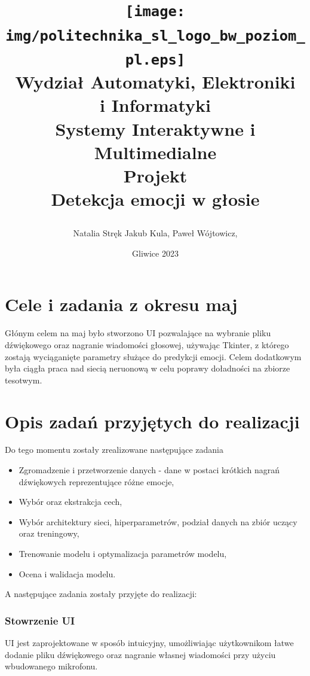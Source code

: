 \documentclass[12pt,titlepage]{article}
\title{
\texttt{[image: img/politechnika\_sl\_logo\_bw\_poziom\_pl.eps]}\\
\textbf{Wydział Automatyki, Elektroniki\\
i Informatyki}\\
\vspace*{1cm}
Systemy Interaktywne i Multimedialne \\ Projekt \\ Detekcja emocji w głosie

\vspace*{5cm}
}
\author{
Natalia Stręk
Jakub Kula,
Paweł Wójtowicz,
}
\date{Gliwice 2023}
\begin{document}
\maketitle

\tableofcontents

\newpage
\section{Cele i zadania z okresu maj}
Głónym celem na maj było stworzono UI pozwalające na wybranie pliku dźwiękowego oraz nagranie wiadomości głosowej, używając Tkinter, z którego zostają wyciąganięte parametry służące do predykcji emocji. Celem dodatkowym była ciągła praca nad siecią neruonową w celu poprawy doładności na zbiorze tesotwym.

\section{Opis zadań przyjętych do realizacji}
Do tego momentu zostały zrealizowane następujące zadania
\begin{itemize}
    \item Zgromadzenie i przetworzenie danych - dane w postaci krótkich nagrań dźwiękowych reprezentujące różne emocje,
    \item Wybór oraz ekstrakcja cech,
    \item Wybór architektury sieci, hiperparametrów, podział danych na zbiór uczący oraz treningowy,
    \item Trenowanie modelu i optymalizacja parametrów modelu,
    \item Ocena i walidacja modelu.
\end{itemize}

A następujące zadania zostały przyjęte do realizacji:
\subsubsection{Stowrzenie UI}
UI jest zaprojektowane w sposób intuicyjny, umożliwiając użytkownikom łatwe dodanie pliku dźwiękowego oraz nagranie własnej wiadomości przy użyciu wbudowanego mikrofonu.
\end{document}
